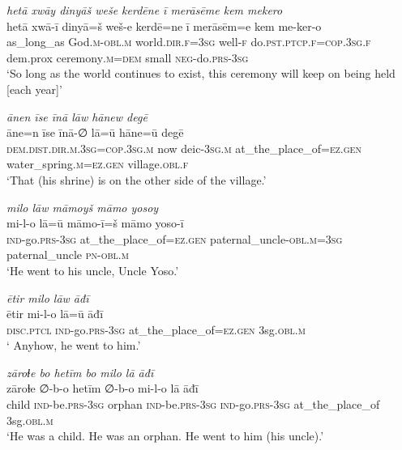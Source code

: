 \ea \label{ZP.130}
\textit{hetā xwāy dinyāš weše kerdēne ī merāsēme kem mekero} \\ 
\gll hetā xwā-ī dinyā=š weš-e kerdē=ne ī merāsēm=e kem me-ker-o \\ 
 as\_long\_as God\textsc{.m}\textsc{-obl}\textsc{.m} world\textsc{.dir}\textsc{.f}\textsc{=3sg} well\textsc{-f} do\textsc{.pst}\textsc{.ptcp}\textsc{.f}\textsc{=cop}\textsc{.3sg}\textsc{.f} dem.prox ceremony\textsc{.m}\textsc{=dem} small \textsc{neg-}do\textsc{.prs}\textsc{-3sg} \\ 
\glt `So long as the world continues to exist, this ceremony will keep on being held [each year]'
\z 
 
\ea \label{ŽP.6}
\textit{ānen īse īnā lāw hānew degē} \\ 
\gll āne=n īse īnā-∅ lā=ū hāne=ū degē \\ 
 \textsc{dem.dist}\textsc{.dir}\textsc{.m}\textsc{.3sg}\textsc{=cop}\textsc{.3sg}\textsc{.m} now deic\textsc{-3sg}\textsc{.m} at\_the\_place\_of\textsc{\textsc{=ez.gen}} water\_spring\textsc{.m}\textsc{\textsc{=ez.gen}} village\textsc{.obl}\textsc{.f} \\ 
\glt `That (his shrine) is on the other side of the village.'
\z 
 
\ea \label{ŽP.11}
\textit{milo lāw māmoyš māmo yosoy} \\ 
\gll mi-l-o lā=ū māmo-ī=š māmo yoso-ī \\ 
 \textsc{ind-}go\textsc{.prs}\textsc{-3sg} at\_the\_place\_of\textsc{\textsc{=ez.gen}} paternal\_uncle\textsc{-obl}\textsc{.m}\textsc{=3sg} paternal\_uncle \textsc{pn}\textsc{-obl}\textsc{.m} \\ 
\glt `He went to his uncle, Uncle Yoso.'
\z 
 
\ea \label{ŽP.13}
\textit{ētir milo lāw āđī} \\ 
\gll ētir mi-l-o lā=ū āđī \\ 
 \textsc{disc.ptcl} \textsc{ind-}go\textsc{.prs}\textsc{-3sg} at\_the\_place\_of\textsc{\textsc{=ez.gen}} 3sg\textsc{.obl}\textsc{.m} \\ 
\glt ` Anyhow, he went to him.'
\z 
 
\ea \label{ŽP.14}
\textit{zāroɫe bo hetīm bo milo lā āđī} \\ 
\gll zāroɫe ∅-b-o hetīm ∅-b-o mi-l-o lā āđī \\ 
 child \textsc{ind-}be\textsc{.prs}\textsc{-3sg} orphan \textsc{ind-}be\textsc{.prs}\textsc{-3sg} \textsc{ind-}go\textsc{.prs}\textsc{-3sg} at\_the\_place\_of 3sg\textsc{.obl}\textsc{.m} \\ 
\glt `He was a child. He was an orphan. He went to him (his uncle).'
\z 
 
